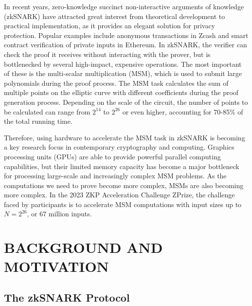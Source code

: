 \documentclass[journal=tches,final]{iacrtrans}
\begin{document}
In recent years, zero-knowledge succinct non-interactive arguments of knowledge (zkSNARK) have attracted great interest from theoretical development to practical implementation, as it provides an elegant solution for privacy protection. Popular examples include anonymous transactions in Zcash and smart contract verification of private inputs in Ethereum. In zkSNARK, the verifier can check the proof it receives without interacting with the prover, but is bottlenecked by several high-impact, expensive operations. The most important of these is the multi-scalar multiplication (MSM), which is used to submit large polynomials during the proof process. The MSM task calculates the sum of multiple points on the elliptic curve with different coefficients during the proof generation process. Depending on the scale of the circuit, the number of points to be calculated can range from $2^{14}$ to $2^{26}$ or even higher, accounting for 70-85\% of the total running time. 

Therefore, using hardware to accelerate the MSM task in zkSNARK is becoming a key research focus in contemporary cryptography and computing. Graphics processing units (GPUs) are able to provide powerful parallel computing capabilities, but their limited memory capacity has become a major bottleneck for processing large-scale and increasingly complex MSM problems. As the computations we need to prove become more complex, MSMs are also becoming more complex. In the 2023 ZKP Acceleration Challenge ZPrize, the challenge faced by participants is to accelerate MSM computations with input sizes up to $N = 2^{26}$, or 67 million inputs.

\section{BACKGROUND AND MOTIVATION}
\subsection{The zkSNARK Protocol}
\end{document}
